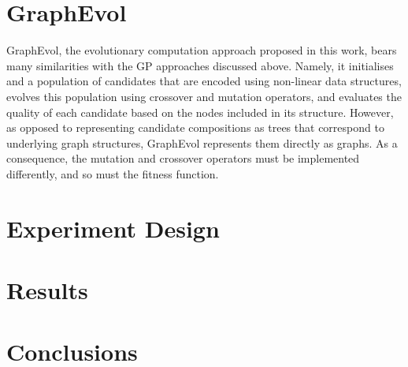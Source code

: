 \documentclass{article}
\begin{document}
\section{GraphEvol}\label{graphevol}
GraphEvol, the evolutionary computation approach proposed in this work, bears many similarities with the GP approaches discussed above. Namely, it initialises and a population 
of candidates that are encoded using non-linear data structures, evolves this population using crossover and mutation operators, and evaluates the quality of each candidate
based on the nodes included in its structure. However, as opposed to representing candidate compositions as trees that correspond to underlying graph structures, GraphEvol
represents them directly as graphs. As a consequence, the mutation and crossover operators must be implemented differently, and so must the fitness function.


\section{Experiment Design}\label{experimentdesign}

\section{Results}\label{results}

\section{Conclusions}\label{conclusions}



\end{document}
